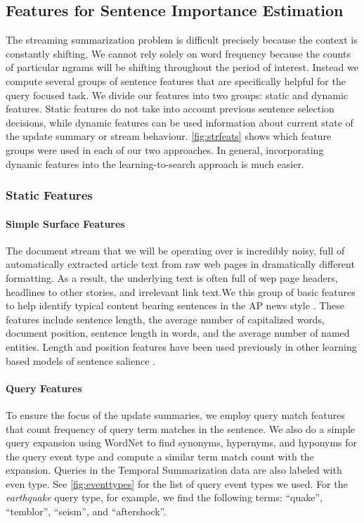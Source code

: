 

\subsection{Features for Sentence Importance Estimation}

The streaming summarization problem is difficult precisely because the context
is constantly shifting. We cannot rely solely on word frequency because
the counts of particular ngrams will be shifting throughout the period of 
interest. Instead we compute several groups of sentence features that are
specifically helpful for the query focused task. We divide our features
into two groups: static and dynamic features. Static features do not take into
account previous sentence selection decisions, while dynamic features
can be used information about current state of the update summary or stream
behaviour. \autoref{fig:strfeats} shows which feature groups were used 
in each of our two approaches. In general, incorporating dynamic features
into the learning-to-search approach is much easier.


\subsubsection{Static Features}
\paragraph{Simple Surface Features} 

The document stream that we will be operating over is incredibly noisy,
full of automatically extracted article text from raw web pages in 
dramatically different formatting. As a result, the underlying text is often
full of wep page headers, headlines to other stories, and irrelevant link text.We this group of basic features to help identify typical content bearing
sentences in the AP news style \citep{ap_style_guide}. These features 
include sentence length, the average number of capitalized words,
document position, sentence length in words, and the average number of 
named entities. Length and position features have been used previously in
other learning based models of sentence salience
\citep{kupiec1995trainable,conroy2001using}.

\paragraph{Query Features} To ensure the focus of the update summaries,
we employ query match features that count frequency of query term matches
in the sentence. We also do a simple query expansion using WordNet 
\citep{miller1995wordnet}
to find  synonyms, hypernyms, and hyponyms for the query event type and compute
a similar term match count with the expansion.
Queries in the Temporal Summarization data are also labeled with even type.
See \autoref{fig:eventtypes} for the list of query event types we used. 
For the \emph{earthquake} query type, for example, we find the following terms:
``quake'', ``temblor'', ``seism'', and ``aftershock''.


